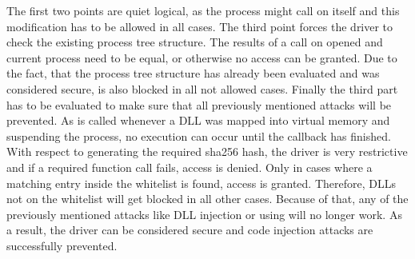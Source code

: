 The first two points are quiet logical, as the process might call  on itself and this modification has to be allowed in all cases. The third point forces the driver to check the existing process tree structure. The results of a  call on opened and current process need to be equal, or otherwise no access can be granted. Due to the fact, that the process tree structure has already been evaluated and was considered secure,  is also blocked in all not allowed cases. Finally the third part has to be evaluated to make sure that all previously mentioned attacks will be prevented. As  is called whenever a DLL was mapped into virtual memory and suspending the process, no execution can occur until the callback has finished. With respect to generating the required sha256 hash, the driver is very restrictive and if a required function call fails, access is denied. Only in cases where a matching entry inside the whitelist is found, access is granted. Therefore, DLLs not on the whitelist will get blocked in all other cases. Because of that, any of the previously mentioned attacks like DLL injection or using  will no longer work. As a result, the driver can be considered secure and code injection attacks are successfully prevented.